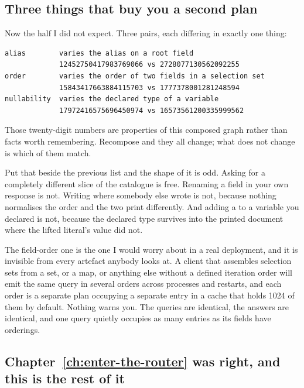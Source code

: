 \subsection*{Three things that buy you a second plan}

%
Now the half I did not expect. Three pairs, each differing in exactly one thing:

\begin{verbatim}
alias        varies the alias on a root field
             12452750417983769066 vs 2728077130562092255
order        varies the order of two fields in a selection set
             15843417663884115703 vs 1777378001281248594
nullability  varies the declared type of a variable
             17972416575696450974 vs 16573561200335999562
\end{verbatim}

Those twenty-digit numbers are properties of this composed graph rather than
facts worth remembering. Recompose and they all change; what does not change is
which of them match.

Put that beside the previous list and the shape of it is odd. Asking for a
completely different slice of the catalogue is free. Renaming a field in your
own response is not. Writing  where somebody else wrote
 is not, because nothing normalises the order and the two
print differently. And adding a \code{!} to a variable you declared is not,
because the declared type survives into the printed document where the lifted
literal's value did not.

%
The field-order one is the one I would worry about in a real deployment, and it
is invisible from every artefact anybody looks at. A client that assembles
selection sets from a set, or a map, or anything else without a defined
iteration order will emit the same query in several orders across processes and
restarts, and each order is a separate plan occupying a separate entry in a
cache that holds 1024 of them by default. Nothing warns you. The queries are
identical, the answers are identical, and one query quietly occupies as many
entries as its fields have orderings.

\subsection*{Chapter~\ref{ch:enter-the-router} was right, and this is the rest of it}

